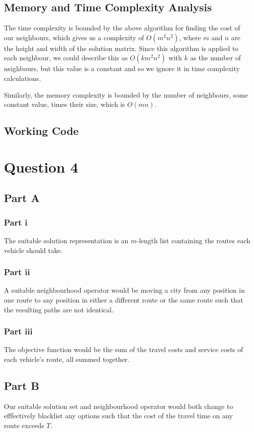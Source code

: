 \documentclass[12pt]{article}
\begin{document}
\subsection*{Memory and Time Complexity Analysis}
The time complexity is bounded by the above algorithm for finding the cost of our neighbours, which gives us a complexity of $O(m^2n^2)$, where $m$ and $n$ are the height and width of the solution matrix. Since this algorithm is applied to each neighbour, we could describe this as $O(km^2n^2)$ with $k$ as the number of neighbours, but this value is a constant and so we ignore it in time complexity calculations.

Similarly, the memory complexity is bounded by the number of neighbours, some constant value, times their size, which is $O(mn)$.

\subsection*{Working Code}


\section*{Question 4}
\subsection*{Part A}
\subsubsection*{Part i}
The suitable solution representation is an $m$-length list containing the routes each vehicle should take.

\subsubsection*{Part ii}
A suitable neighbourhood operator would be moving a city from any position in one route to any position in either a different route or the same route such that the resulting paths are not identical.

\subsubsection*{Part iii}
The objective function would be the sum of the travel costs and service costs of each vehicle's route, all summed together.

\subsection*{Part B}
Our suitable solution set and neighbourhood operator would both change to efffectively blacklist any options such that the cost of the travel time on any route exceeds $T$.
\end{document}
